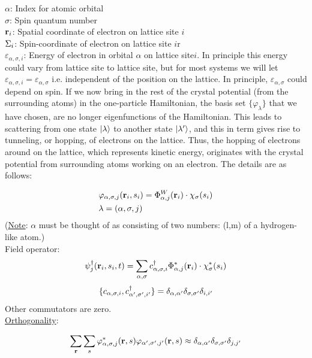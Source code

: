 \noindent $\alpha$: Index for atomic orbital \\
\noindent $\sigma$: Spin quantum number\\
\noindent $\vb{r}_i$: Spatial coordinate of electron on lattice site $i$\\
\noindent $\Sigma_i$: Spin-coordinate of electron on lattice site $i$r\\
\noindent $\varepsilon_{\alpha,\sigma, i}$: Energy of electron in orbital $\alpha$ on lattice site$i$. In principle this energy could vary from lattice site to lattice site, but for most systems we will let $\varepsilon_{\alpha, \sigma, i} = \varepsilon_{\alpha, \sigma}$ i.e. independent of the position on the lattice. In principle, $\varepsilon_{\alpha, \sigma}$ could depend on spin. 
If we now bring in the rest of the crystal potential (from the surrounding atoms) in the one-particle Hamiltonian, the basis set $\{\varphi_\lambda \}$ that we have chosen, are no longer eigenfunctions of the Hamiltonian. This leads to scattering from one state $\ket{\lambda}$ to another state $\ket{\lambda'}$, and this in term gives rise to tunneling, or hopping, of electrons on the lattice. Thus, the hopping of electrons around on the lattice, which represents kinetic energy, originates with the crystal potential from surrounding atoms working on an electron. The details are as follows:

\begin{align*}
	&\varphi_{\alpha, \sigma,j}(\vb{r}_i,s_i) = \Phi_{\alpha, j}^W (\vb{r}_i) \cdot \chi_\sigma (s_i)\\
	&\lambda = (\alpha, \sigma, j)
\end{align*}
(\uline{Note}: $\alpha$ must be thought of as consisting of two numbers: (l,m) of a hydrogen-like atom.)\\

\noindent Field operator:
\begin{align*}
	\psi^\dagger_j(\vb{r}_i, s_i, t)= \sum_{\alpha, \sigma} c^{\dagger}_{\alpha, \sigma, i} \Phi_{\alpha, j}^* (\vb{r}_i) \cdot \chi^*_\sigma (s_i)
\end{align*}
\begin{align*}
	\{ c_{\alpha, \sigma, i},c^{\dagger}_{\alpha', \sigma', i'} \} = \delta_{\alpha, \alpha'} \delta_{\sigma,\sigma'} \delta_{i,i'}
\end{align*}
Other commutators are zero.\\

\noindent \uline{Orthogonality}:

\begin{align*}
	\sum_{\vb{r}} \sum_s  \varphi^*_{\alpha, \sigma,j}(\vb{r},s)\varphi_{\alpha', \sigma',j'}(\vb{r},s) \approx \delta_{\alpha, \alpha'} \delta_{\sigma,\sigma'} \delta_{j,j'}
\end{align*}

